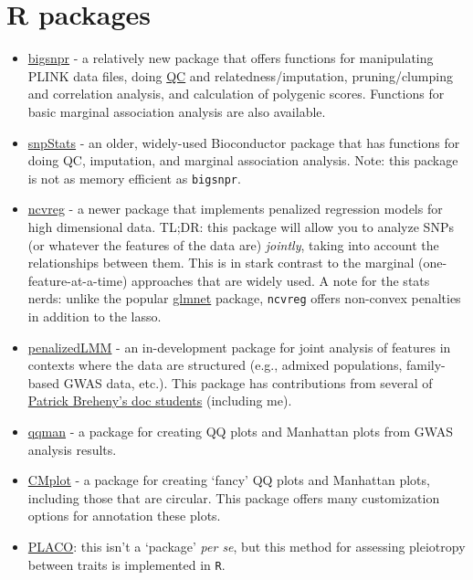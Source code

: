 \documentclass[
]{book}
\begin{document}
\hypertarget{r-packages}{%
\section{R packages}\label{r-packages}}

\begin{itemize}
\item
  \href{https://privefl.github.io/bigsnpr/index.html}{bigsnpr} - a relatively new package that offers functions for manipulating PLINK data files, doing \protect\hyperlink{acronyms}{QC} and relatedness/imputation, pruning/clumping and correlation analysis, and calculation of polygenic scores. Functions for basic marginal association analysis are also available.
\item
  \href{https://www.bioconductor.org/packages/release/bioc/html/snpStats.html}{snpStats} - an older, widely-used Bioconductor package that has functions for doing QC, imputation, and marginal association analysis. Note: this package is not as memory efficient as \texttt{bigsnpr}.
\item
  \href{https://pbreheny.github.io/ncvreg/}{ncvreg} - a newer package that implements penalized regression models for high dimensional data. TL;DR: this package will allow you to analyze SNPs (or whatever the features of the data are) \emph{jointly}, taking into account the relationships between them. This is in stark contrast to the marginal (one-feature-at-a-time) approaches that are widely used. A note for the stats nerds: unlike the popular \href{https://glmnet.stanford.edu/articles/glmnet.html\#:~:text=Glmnet\%20is\%20a\%20package\%20that,for\%20the\%20regularization\%20parameter\%20lambda.}{glmnet} package, \texttt{ncvreg} offers non-convex penalties in addition to the lasso.
\item
  \href{https://areisett.github.io/penalizedLMM/}{penalizedLMM} - an in-development package for joint analysis of features in contexts where the data are structured (e.g., admixed populations, family-based GWAS data, etc.). This package has contributions from several of \href{https://myweb.uiowa.edu/pbreheny/students.html}{Patrick Breheny's doc students} (including me).
\item
  \href{https://cran.r-project.org/web/packages/qqman/}{qqman} - a package for creating QQ plots and Manhattan plots from GWAS analysis results.
\item
  \href{https://github.com/YinLiLin/CMplot}{CMplot} - a package for creating `fancy' QQ plots and Manhattan plots, including those that are circular. This package offers many customization options for annotation these plots.
\item
  \href{https://github.com/RayDebashree/PLACO}{PLACO}: this isn't a `package' \emph{per se}, but this method for assessing pleiotropy between traits is implemented in \texttt{R}.
\end{itemize}
\end{document}

